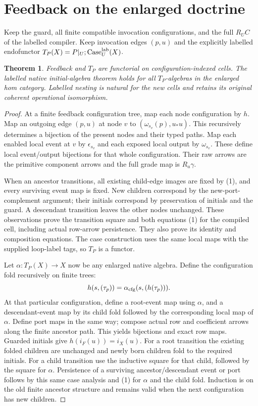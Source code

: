 \documentclass[11pt]{article}
\newtheorem{theorem}[definition]{Theorem}
\begin{document}
\section{Feedback on the enlarged doctrine}
Keep the guard, all finite compatible invocation configurations, and the full
$R_U C$ of the labelled compiler. Keep invocation edges $(p,u)$ and the
explicitly labelled endofunctor
$T_P(X)=P|_U;\operatorname{Case}^{\rm lab}_U(X)$.
\begin{theorem}
Feedback and $T_P$ are functorial on configuration-indexed cells.
The labelled native initial-algebra theorem holds for all
$T_P$-algebras in the enlarged hom category. Labelled nesting is natural
for the new cells and retains its original coherent operational isomorphism.
\end{theorem}
\begin{proof}
At a finite feedback configuration tree, map each node configuration by $h$.
Map an outgoing edge $(p,u)$ at node $v$ to
$(\omega_{s_v}(p),u_*u)$. This recursively determines a bijection of the
present nodes and their typed paths. Map each enabled local event at $v$
by $\epsilon_{s_v}$ and each exposed local output by $\omega_{s_v}$.
These define local event/output bijections for that whole configuration.
Their raw arrows are the primitive component arrows and the full grade map
is $R_u\gamma$.

When an ancestor transitions, all existing child-edge images are fixed by
(1), and every surviving event map is fixed. New children correspond by
the new-port-complement argument; their initials correspond by preservation
of initials and the guard. A descendant transition leaves the other nodes
unchanged. These observations prove the transition square and both equations
(1) for the compiled cell, including actual row-arrow persistence. They also
prove its identity and composition equations. The case construction uses
the same local maps with the supplied loop-label tags, so $T_P$ is a functor.

Let $\alpha:T_P(X)\to X$ now be any enlarged native algebra. Define the
configuration fold recursively on finite trees:
\[
 h(s,(\tau_p))=\alpha_{\rm cfg}(s,(h(\tau_p))).
\]
At that particular configuration, define a root-event map using $\alpha$,
and a descendant-event map by its child fold followed by the corresponding
local map of $\alpha$. Define port maps in the same way; compose actual row
and coefficient arrows along the finite ancestor path. This yields
bijections and exact row maps. Guarded initials give
$h(i_F(u))=i_X(u)$.
For a root transition the existing folded children are unchanged and newly
born children fold to the required initials. For a child transition use
the inductive square for that child, followed by the square for $\alpha$.
Persistence of a surviving ancestor/descendant event or port follows by
this same case analysis and (1) for $\alpha$ and the child fold. Induction
is on the old finite ancestor structure and remains valid when the next
configuration has new children.


\end{proof}
\end{document}
